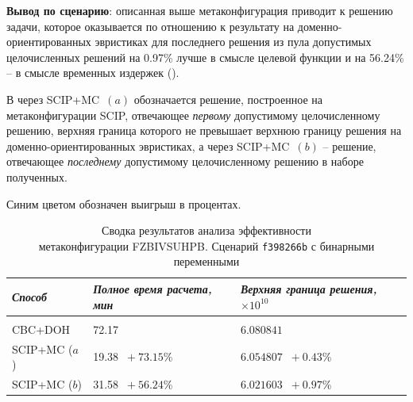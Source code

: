 \documentclass[%
	11pt,
	a4paper,
	utf8,
		]{article}
\begin{document}
\vspace*{3mm}
\textbf{Вывод по сценарию}: описанная выше метаконфигурация приводит к решению задачи, которое оказывается по отношению к результату на доменно-ориентированных эвристиках для последнего решения из пула допустимых целочисленных решений на 0.97\% лучше в смысле целевой функции и на 56.24\% -- в смысле временных издержек ().

В   через SCIP+MC~$ (a) $ обозначается решение, построенное на метаконфигурации SCIP, отвечающее \emph{первому} допустимому целочисленному решению, верхняя граница которого не превышает верхнюю границу решения на доменно-ориентированных эвристиках, а через SCIP+MC~$ (b) $ -- решение, отвечающее \emph{последнему} допустимому целочисленному решению в наборе полученных.

Синим цветом обозначен выигрыш в процентах.

{
	\begin{table}[!h]
		\centering
		\caption{Сводка результатов анализа эффективности\\метаконфигурации FZBIVSUHPB. Сценарий \texttt{f398266b} с бинарными переменными}
		\begin{tabular}{ p{2.5cm} p{3.3cm} p{3.4cm} }
			\emph{Способ} & \emph{Полное время расчета, мин} & \emph{Верхняя граница решения, $ \times 10^{10} $} \\
			\hline\hline\\[-3.5mm]
			{CBC+DOH} & 72.17 & $ 6.080841 $ \\
			\hline
			SCIP+MC ($ a $) & 19.38 {\color{blue} $\ +73.15 $\%} & $ 6.054807 $ {\color{blue} $\ +0.43 $\%} \\
			\hline
			SCIP+MC ($ b $) & 31.58 {\color{blue} $\ +56.24 $\%} & $ 6.021603 $ {\color{blue} $\ +0.97 $\%} \\
		\end{tabular}\label{tab:f398266b}
	\end{table}
}
\end{document}

